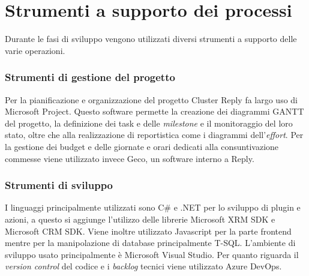 \section{Strumenti a supporto dei processi}
Durante le fasi di sviluppo vengono utilizzati diversi strumenti a supporto delle varie operazioni.

\subsubsection{Strumenti di gestione del progetto}
Per la pianificazione e organizzazione del progetto Cluster Reply fa largo uso di Microsoft Project. Questo software permette la creazione dei diagrammi GANTT del progetto, la definizione dei task e delle \textit{milestone} e il monitoraggio del loro stato, oltre che alla realizzazione di reportistica come i diagrammi dell'\textit{effort}. 
Per la gestione dei budget e delle giornate e orari dedicati alla consuntivazione commesse viene utilizzato invece Geco, un software interno a Reply.

\subsubsection{Strumenti di sviluppo} I linguaggi principalmente utilizzati sono C\# e .NET per lo sviluppo di plugin e azioni, a questo si aggiunge l'utilizzo delle librerie Microsoft XRM SDK e Microsoft CRM SDK.
Viene inoltre utilizzato Javascript per la parte frontend mentre per la manipolazione di database principalmente T-SQL. 
L'ambiente di sviluppo usato principalmente è Microsoft Visual Studio.
Per quanto riguarda il \textit{version control} del codice e i \textit{backlog} tecnici viene utilizzato Azure DevOps.



